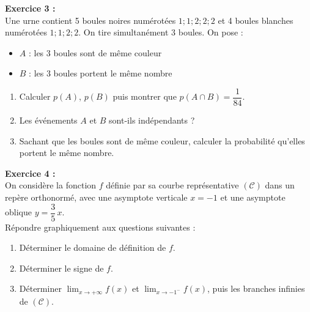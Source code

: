 \noindent\textbf{Exercice 3 :}\\
Une urne contient 5 boules noires num\'{e}rot\'{e}es $1;1;2;2;2$
et 4 boules blanches num\'{e}rot\'{e}es $1;1;2;2$.
On tire simultan\'{e}ment 3 boules. On pose :
\begin{itemize}[itemsep=0pt, topsep=2pt, leftmargin=2em]
  \item $A$ : \guillemotleft{} les 3 boules sont de m\^{e}me couleur \guillemotright{}
  \item $B$ : \guillemotleft{} les 3 boules portent le m\^{e}me nombre \guillemotright{}
\end{itemize}

\begin{enumerate}[leftmargin=1.5em, label=\textbf{\arabic*.}, itemsep=2pt, topsep=4pt]
  \item Calculer $p(A)$, $p(B)$ puis montrer que $p(A \cap B) = \dfrac{1}{84}$.
  \item Les \'{e}v\'{e}nements $A$ et $B$ sont-ils ind\'{e}pendants ?
  \item Sachant que les boules sont de m\^{e}me couleur,
        calculer la probabilit\'{e} qu'elles portent le m\^{e}me nombre.
\end{enumerate}

\medskip

\noindent\textbf{Exercice 4 :}\\
On consid\`{e}re la fonction $f$ d\'{e}finie par sa courbe repr\'{e}sentative $(\mathcal{C})$
dans un rep\`{e}re orthonorm\'{e}, avec une asymptote verticale $x = -1$
et une asymptote oblique $y = \dfrac{3}{5}\,x$.\\
R\'{e}pondre graphiquement aux questions suivantes :

\begin{enumerate}[leftmargin=1.5em, label=\textbf{\arabic*.}, itemsep=2pt, topsep=4pt]
  \item D\'{e}terminer le domaine de d\'{e}finition de $f$.
  \item D\'{e}terminer le signe de $f$.
  \item D\'{e}terminer $\displaystyle\lim_{x \to +\infty} f(x)$ et
        $\displaystyle\lim_{x \to -1^-} f(x)$,
        puis les branches infinies de $(\mathcal{C})$.
\end{enumerate}

